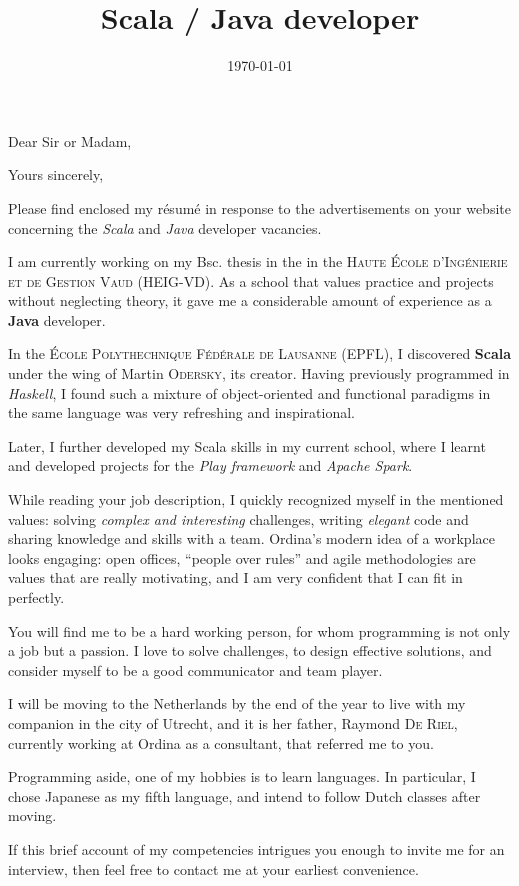 \documentclass[10pt,a4paper,roman]{moderncv}
\title{Scala / Java developer}
\begin{document}
\date{\today}
\opening{Dear Sir or Madam,}
\closing{Yours sincerely,}

\makelettertitle

Please find enclosed my résumé in response to the advertisements on your website concerning the \textit{Scala} and \textit{Java} developer vacancies.

I am currently working on my Bsc. thesis in the in the \textsc{Haute École d'Ingénierie et de Gestion Vaud} (HEIG-VD). As a school that values practice and projects without neglecting theory, it gave me a considerable amount of experience as a \textbf{Java} developer.

In the \textsc{École Polythechnique Fédérale de Lausanne} (EPFL), I discovered \textbf{Scala} under the wing of Martin \textsc{Odersky}, its creator. Having previously programmed in \textit{Haskell}, I found such a mixture of object-oriented and functional paradigms in the same language was very refreshing and inspirational.

Later, I further developed my Scala skills in my current school, where I learnt and developed projects for the \textit{Play framework} and \textit{Apache Spark}.

While reading your job description, I quickly recognized myself in the mentioned values: solving \textit{complex and interesting} challenges, writing \textit{elegant} code and sharing knowledge and skills with a team. Ordina's modern idea of a workplace looks engaging: open offices, ``people over rules'' and agile methodologies are values that are really motivating, and I am very confident that I can fit in perfectly.

You will find me to be a hard working person, for whom programming is not only a job but a passion. I love to solve challenges, to design effective solutions, and consider myself to be a good communicator and team player.

I will be moving to the Netherlands by the end of the year to live with my companion in the city of Utrecht, and it is her father, Raymond \textsc{De Riel}, currently working at Ordina as a consultant, that referred me to you.

Programming aside, one of my hobbies is to learn languages. In particular, I chose Japanese as my fifth language, and intend to follow Dutch classes after moving.

If this brief account of my competencies intrigues you enough to invite me for an interview, then feel free to contact me at your earliest convenience. 

\makeletterclosing
\end{document}
